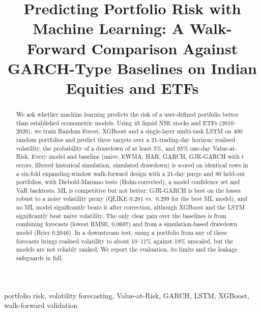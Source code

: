 \documentclass[conference,a4paper]{IEEEtran}
\begin{document}
\title{Predicting Portfolio Risk with Machine Learning: A Walk-Forward Comparison Against GARCH-Type Baselines on Indian Equities and ETFs}

\author{
}

\maketitle

\begin{abstract}
We ask whether machine learning predicts the risk of a user-defined portfolio
better than established econometric models. Using 45 liquid NSE stocks and ETFs (2010--2026), we
train Random Forest, XGBoost and a single-layer multi-task LSTM on 400 random portfolios and predict
three targets over a 21-trading-day horizon: realised volatility, the probability of a drawdown of
at least 5\%, and 95\% one-day Value-at-Risk. Every model and baseline (naive, EWMA, HAR, GARCH,
GJR-GARCH with $t$ errors, filtered historical simulation, simulated drawdown) is scored on identical
rows in a six-fold expanding-window walk-forward design with a 21-day purge and 80 held-out
portfolios, with Diebold-Mariano tests (Holm-corrected), a model confidence set and VaR backtests.
ML is competitive but not better: GJR-GARCH is best on the losses robust to a noisy volatility proxy
(QLIKE 0.281 vs.\ 0.299 for the best ML model), and no ML model significantly beats it after
correction, although XGBoost and the LSTM significantly beat naive volatility. The only clear gain
over the baselines is from combining forecasts (lowest RMSE, 0.0697) and from a simulation-based
drawdown model (Brier 0.2046). In a downstream test, sizing a portfolio from any of these forecasts
brings realised volatility to about 10--11\% against 19\% unscaled, but the models are not reliably
ranked. We report the evaluation, its limits and the leakage safeguards in full.
\end{abstract}

\begin{IEEEkeywords}
portfolio risk, volatility forecasting, Value-at-Risk, GARCH, LSTM, XGBoost, walk-forward validation
\end{IEEEkeywords}
\end{document}

